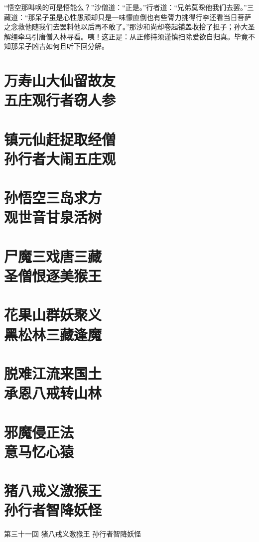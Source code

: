 \documentclass[12pt,UTF8]{ctexbook}
\begin{document}
{“悟空那叫唤的可是悟能么？”沙僧道：“正是。”行者道：“兄弟莫睬他我们去罢。”三藏道：“那呆子虽是心性愚顽却只是一味懞直倒也有些膂力挑得行李还看当日菩萨之念救他随我们去罢料他以后再不敢了。”那沙和尚却卷起铺盖收拾了担子；孙大圣解缰牵马引唐僧入林寻看。咦！这正是：从正修持须谨慎扫除爱欲自归真。毕竟不知那呆子凶吉如何且听下回分解。

\chapter[万寿山大仙留故友\ 五庄观行者窃人参]{万寿山大仙留故友\\五庄观行者窃人参}
\chapter[镇元仙赶捉取经僧\ 孙行者大闹五庄观]{镇元仙赶捉取经僧\\孙行者大闹五庄观}
\chapter[孙悟空三岛求方\ 观世音甘泉活树]{孙悟空三岛求方\\观世音甘泉活树}
\chapter[尸魔三戏唐三藏\ 圣僧恨逐美猴王]{尸魔三戏唐三藏\\圣僧恨逐美猴王}
\chapter[花果山群妖聚义\ 黑松林三藏逢魔]{花果山群妖聚义\\黑松林三藏逢魔}
\chapter[脱难江流来国土\ 承恩八戒转山林]{脱难江流来国土\\承恩八戒转山林}
\chapter[邪魔侵正法\ 意马忆心猿]{邪魔侵正法\\意马忆心猿}
\chapter[猪八戒义激猴王\ 孙行者智降妖怪]{猪八戒义激猴王\\孙行者智降妖怪}

第三十一回 猪八戒义激猴王 孙行者智降妖怪

}
\end{document}
